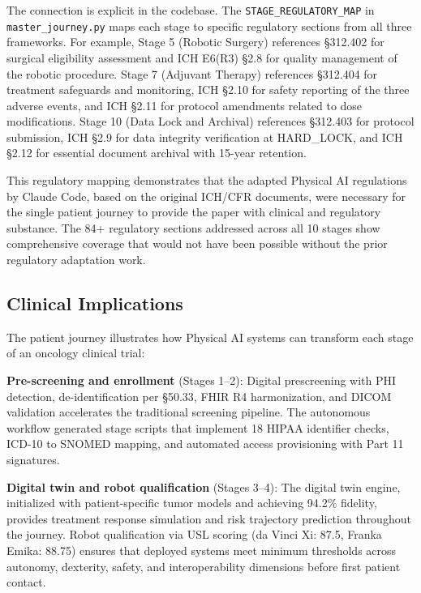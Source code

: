 \documentclass{article}
\begin{document}
The connection is explicit in the codebase. The \texttt{STAGE\_REGULATORY\_MAP} in \texttt{master\_journey.py} maps each stage to specific regulatory sections from all three frameworks. For example, Stage 5 (Robotic Surgery) references \S312.402 for surgical eligibility assessment and ICH E6(R3) \S2.8 for quality management of the robotic procedure. Stage 7 (Adjuvant Therapy) references \S312.404 for treatment safeguards and monitoring, ICH \S2.10 for safety reporting of the three adverse events, and ICH \S2.11 for protocol amendments related to dose modifications. Stage 10 (Data Lock and Archival) references \S312.403 for protocol submission, ICH \S2.9 for data integrity verification at HARD\_LOCK, and ICH \S2.12 for essential document archival with 15-year retention.

This regulatory mapping demonstrates that the adapted Physical AI regulations by Claude Code, based on the original ICH/CFR documents, were necessary for the single patient journey to provide the paper with clinical and regulatory substance. The 84+ regulatory sections addressed across all 10 stages show comprehensive coverage that would not have been possible without the prior regulatory adaptation work.

\subsection{Clinical Implications}

The patient journey illustrates how Physical AI systems can transform each stage of an oncology clinical trial:

\textbf{Pre-screening and enrollment} (Stages 1--2): Digital prescreening with PHI detection, de-identification per \S50.33, FHIR R4 harmonization, and DICOM validation accelerates the traditional screening pipeline. The autonomous workflow generated stage scripts that implement 18 HIPAA identifier checks, ICD-10 to SNOMED mapping, and automated access provisioning with Part 11 signatures.

\textbf{Digital twin and robot qualification} (Stages 3--4): The digital twin engine, initialized with patient-specific tumor models and achieving 94.2\% fidelity, provides treatment response simulation and risk trajectory prediction throughout the journey. Robot qualification via USL scoring (da Vinci Xi: 87.5, Franka Emika: 88.75) ensures that deployed systems meet minimum thresholds across autonomy, dexterity, safety, and interoperability dimensions before first patient contact.
\end{document}

